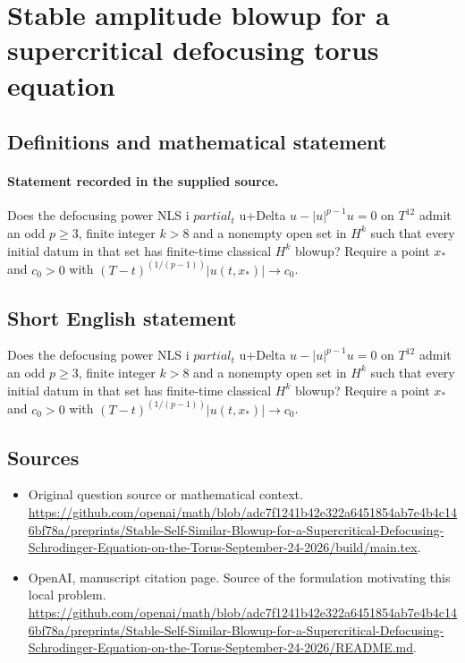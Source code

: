 \documentclass[11pt]{article}
\begin{document}
\section*{Stable amplitude blowup for a supercritical defocusing torus equation}\label{30007319}
\subsection{Definitions and mathematical statement}
\paragraph{Statement recorded in the supplied source.}
Does the defocusing power NLS i $partial_t$ u+Delta $u-|u|^{p-1}u=0$ on $T^12$ admit an odd $p\geq 3$, finite integer $k>8$ and a nonempty open set in $H^k$ such that every initial datum in that set has finite-time classical $H^k$ blowup? Require a point $x_*$ and $c_0>0$ with $(T-t)^(1/(p-1))|u(t,x_*)|\to c_0$.
\subsection{Short English statement}
Does the defocusing power NLS i $partial_t$ u+Delta $u-|u|^{p-1}u=0$ on $T^12$ admit an odd $p\geq 3$, finite integer $k>8$ and a nonempty open set in $H^k$ such that every initial datum in that set has finite-time classical $H^k$ blowup? Require a point $x_*$ and $c_0>0$ with $(T-t)^(1/(p-1))|u(t,x_*)|\to c_0$.
\subsection{Sources}
\begin{itemize}
\item[S1] Original question source or mathematical context.
\url{https://github.com/openai/math/blob/adc7f1241b42e322a6451854ab7e4b4c146bf78a/preprints/Stable-Self-Similar-Blowup-for-a-Supercritical-Defocusing-Schrodinger-Equation-on-the-Torus-September-24-2026/build/main.tex}.
\item[S2] OpenAI, manuscript citation page. Source of the formulation motivating this local problem.
\url{https://github.com/openai/math/blob/adc7f1241b42e322a6451854ab7e4b4c146bf78a/preprints/Stable-Self-Similar-Blowup-for-a-Supercritical-Defocusing-Schrodinger-Equation-on-the-Torus-September-24-2026/README.md}.
\end{itemize}
\end{document}
